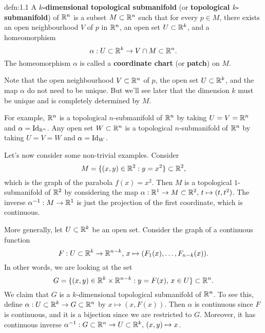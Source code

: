 \begin{defn}{defn:1.1}
    A {\bf $k$-dimensional topological submanifold} (or 
    {\bf topological $k$-submanifold}) of $\mathbb{R}^n$ is a subset $M \subset \mathbb{R}^n$ 
    such that for every $p \in M$, there exists an open neighbourhood $V$ 
    of $p$ in $\mathbb{R}^n$, an open set $U \subset \mathbb{R}^k$, and a homeomorphism 
    \[ \alpha : U \subset \mathbb{R}^k \to V \cap M \subset \mathbb{R}^n. \] 
    The homeomorphism $\alpha$ is called a {\bf coordinate chart} 
    (or {\bf patch}) on $M$.
\end{defn}\vspace{-0.25cm}

Note that the open neighbourhood $V \subset \mathbb{R}^n$ of $p$, the 
open set $U \subset \mathbb{R}^k$, and the map $\alpha$ do not need to be unique.
But we'll see later that the dimension $k$ must be unique and is completely 
determined by $M$.

For example, $\mathbb{R}^n$ is a topological $n$-submanifold of $\mathbb{R}^n$ 
by taking $U = V = \mathbb{R}^n$ and $\alpha = \operatorname{Id}_{\mathbb{R}^n}$. Any open set 
$W \subset \mathbb{R}^n$ is a topological $n$-submanifold of $\mathbb{R}^n$ by 
taking $U = V = W$ and $\alpha = \operatorname{Id}_W$. 

Let's now consider some non-trivial examples. Consider 
\[ M = \{(x, y) \in \mathbb{R}^2 : y = x^2\} \subset \mathbb{R}^2, \] 
which is the graph of the parabola $f(x) = x^2$. Then $M$ is a 
topological $1$-submanifold of $\mathbb{R}^2$ by considering the map 
$\alpha : \mathbb{R}^1 \to M \subset \mathbb{R}^2,\, t \mapsto (t, t^2)$.
The inverse $\alpha^{-1} : M \to \mathbb{R}^1$ is just the projection of the 
first coordinate, which is continuous. 

More generally, let $U \subset \mathbb{R}^k$ be an open set. Consider the graph of a 
continuous function 
\[ F : U \subset \mathbb{R}^k \to \mathbb{R}^{n-k},\, x \mapsto (F_1(x), \dots, F_{n-k}(x)). \]
In other words, we are looking at the set 
\[ G = \{(x, y) \in \mathbb{R}^k \times \mathbb{R}^{n-k} : y = F(x),\, x \in U\} \subset \mathbb{R}^n. \] 
We claim that $G$ is a $k$-dimensional topological submanifold of $\mathbb{R}^n$. To 
see this, define $\alpha : U \subset \mathbb{R}^k \to G \subset \mathbb{R}^n$ by 
$x \mapsto (x, F(x))$. Then $\alpha$ is continuous since $F$ is continuous, 
and it is a bijection since we are restricted to $G$. Moreover, 
it has continuous inverse $\alpha^{-1} : G \subset \mathbb{R}^n \to 
U \subset \mathbb{R}^k,\, (x, y) \mapsto x$. 

